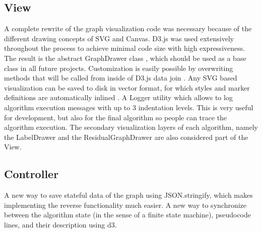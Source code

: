 \subsection{View}\label{sec:view}
A complete rewrite of the graph visualization code was necessary because of the different drawing concepts of SVG and Canvas. D3.js was used extensively throughout the process to achieve minimal code size with high expressiveness. The result is the abstract GraphDrawer class , which should be used as a base class in all future projects. Customization is easily possible by overwriting methods that will be called from inside of D3.js data join . Any SVG based visualization can be saved to disk in vector format, for which styles and marker definitions are automatically inlined . A Logger utility which allows to log algorithm execution messages with up to 3 indentation levels. This is very useful for development, but also for the final algorithm so people can trace the algorithm execution. The secondary visualization layers of each algorithm, namely the LabelDrawer and the ResidualGraphDrawer are also considered part of the View. 



\subsection{Controller}\label{sec:controller}
	A new way to save stateful data of the graph using JSON.stringify, which makes implementing the reverse functionality much easier. A new way to synchronize between the algorithm state (in the sense of a finite state machine), pseudocode lines, and their description using d3.



